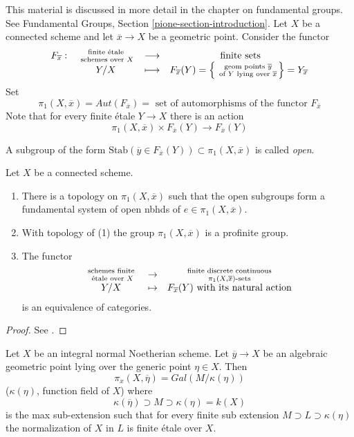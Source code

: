 \noindent
This material is discussed in more detail in the chapter on
fundamental groups. See
Fundamental Groups, Section \ref{pione-section-introduction}.
Let $X$ be a connected scheme and let $\overline{x}\to X$ be a
geometric point. Consider the functor
$$
\begin{matrix}
F_{\overline{x}}: &
\text{ finite \'etale } \atop \text{ schemes over } X &
\longrightarrow & \text{ finite sets} \\
&
Y/X &
\longmapsto &
F_{\overline{x}}(Y) =
\left\{\text{ geom points }\overline y \atop \text{ of } Y
\text{ lying over }\overline{x}\right\} = Y_{\overline{x}}
\end{matrix}
$$
Set
$$
\pi_1(X, \overline{x})
=
Aut(F_{\overline{x}})
=
\text{ set of automorphisms of the functor }F_{\overline{x}}
$$
Note that for every finite \'etale $Y \to X$ there is an action
$$
\pi_1(X, \overline{x}) \times F_{\overline{x}}(Y) \to F_{\overline{x}}(Y)
$$

\begin{definition}
\label{definition-open}
A subgroup of the form
$\text{Stab}(\overline y\in F_{\overline{x}}(Y))\subset \pi_1(X, \overline{x})$
is called {\it open}.
\end{definition}

\begin{theorem}[Grothendieck]
\label{theorem-fundamental-group}
Let $X$ be a connected scheme.
\begin{enumerate}
\item There is a topology on $\pi_1(X, \overline{x})$ such that the open
subgroups form a fundamental system of open nbhds of $e\in \pi_1(X, \overline
x)$.
\item With topology of (1) the group
$\pi_1(X, \overline{x})$ is a profinite group.
\item The functor
$$
\begin{matrix}
\text{ schemes finite } \atop \text{ \'etale over }X & \to &
\text{ finite discrete continuous } \atop \pi_1(X, \overline{x})\text{-sets}\\
Y / X& \mapsto & F_{\overline{x}}(Y) \text{ with its natural action}
\end{matrix}
$$
is an equivalence of categories.
\end{enumerate}
\end{theorem}

\begin{proof}
See \cite{SGA1}.
\end{proof}

\begin{proposition}
\label{proposition-integral-normal-fundamental-group}
Let $X$ be an integral normal Noetherian scheme. Let
$\overline y\to X$ be an algebraic geometric point lying
over the generic point $\eta\in X$. Then
$$
\pi_x(X, \overline \eta) = Gal(M/\kappa(\eta))
$$
($\kappa(\eta)$, function field of $X$) where
$$
\kappa(\overline \eta)\supset M\supset \kappa(\eta) = k(X)
$$
is the max sub-extension such that for every finite sub extension
$M\supset L\supset \kappa(\eta)$ the normalization of $X$ in $L$ is finite
\'etale over $X$.
\end{proposition}


